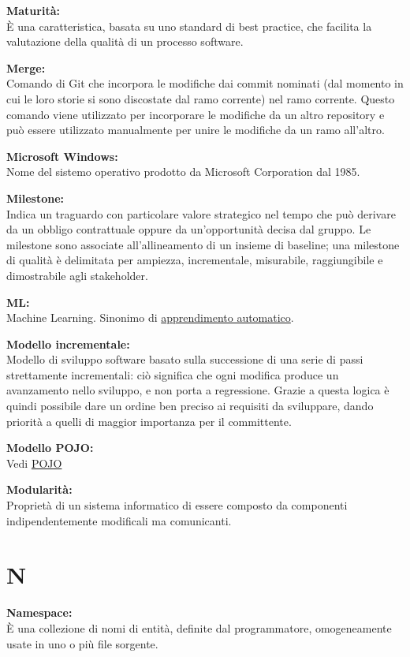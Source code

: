 \documentclass[a4paper, oneside, openany, dvipsnames, table]{article}
\begin{document}
\textbf{Maturità:}\\ \`E una caratteristica, basata su uno standard di best practice, che facilita la valutazione della qualità di un processo software. 

\textbf{Merge:}\\	Comando di Git che incorpora le modifiche dai commit nominati (dal momento in cui le loro storie si sono discostate dal ramo corrente) nel ramo corrente. Questo comando viene utilizzato per incorporare le modifiche da un altro repository e può essere utilizzato manualmente per unire le modifiche da un ramo all'altro.

\textbf{Microsoft Windows:}\\	Nome del sistemo operativo prodotto da Microsoft Corporation dal 1985.

\textbf{Milestone:}\\	Indica un traguardo con particolare valore strategico nel tempo che può derivare da un obbligo contrattuale oppure da un'opportunità decisa dal gruppo. Le milestone sono associate all'allineamento di un insieme di baseline; una milestone di qualità è delimitata per ampiezza, incrementale, misurabile, raggiungibile e dimostrabile agli stakeholder.

\textbf{ML:}\\Machine Learning. Sinonimo di \hyperref[par:appr_auto]{apprendimento automatico}.

\textbf{Modello incrementale:}\\	Modello di sviluppo software basato sulla successione di una serie di passi strettamente incrementali: ciò significa che ogni modifica produce un avanzamento nello sviluppo, e non porta a regressione. Grazie a questa logica è quindi possibile dare un ordine ben preciso ai requisiti da sviluppare, dando priorità a quelli di maggior importanza per il committente.

\textbf{Modello POJO:} \\Vedi \hyperref[crts:POJO]{POJO}

\textbf{Modularità:}\\	Proprietà di un sistema informatico di essere composto da componenti indipendentemente modificali ma comunicanti.


\newpage
\section{N}

\textbf{Namespace:} \\ \`E una collezione di nomi di entità, definite dal programmatore, omogeneamente usate in uno o più file sorgente.
\end{document}
